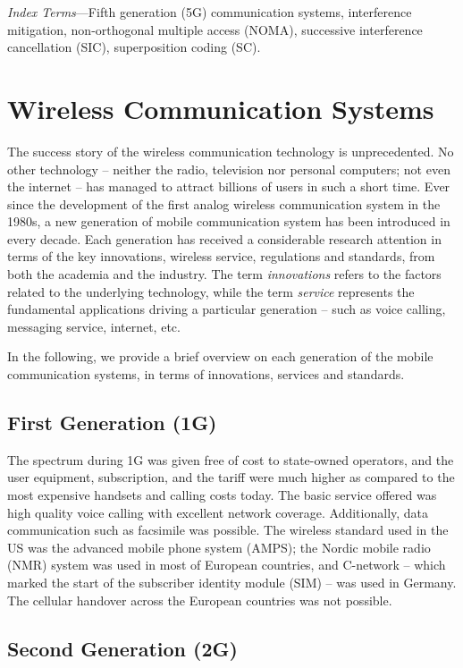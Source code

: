 \begin{multicols}{2}
\textit{Index Terms}---Fifth generation (5G) communication systems, interference mitigation, non-orthogonal multiple access (NOMA), successive interference cancellation (SIC), superposition coding (SC).


\section{Wireless Communication Systems}

The success story of the wireless communication technology is unprecedented. No other technology -- neither the radio, television nor personal computers; not even the internet -- has managed to attract billions of users in such a short time. Ever since the development of the first analog wireless communication system in the 1980s, a new generation of mobile communication system has been introduced in every decade. Each generation has received a considerable research attention in terms of the key innovations, wireless service, regulations and standards, from both the academia and the industry. The term \emph{innovations} refers to the factors related to the underlying technology, while the term \emph{service} represents the fundamental applications driving a particular generation -- such as voice calling, messaging service, internet, etc.

In the following, we provide a brief overview on each generation of the mobile communication systems, in terms of innovations, services and standards.

\subsection{First Generation (1G)} \label{SubSec_1G}

The spectrum during 1G was given free of cost to state-owned operators, and the user equipment, subscription, and the tariff were much higher as compared to the most expensive handsets and calling costs today. The basic service offered was high quality voice calling with excellent network coverage. Additionally, data communication such as facsimile was possible. The wireless standard used in the US was the advanced mobile phone system (AMPS); the Nordic mobile radio (NMR) system was used in most of European countries, and C-network -- which marked the start of the subscriber identity module (SIM) -- was used in Germany. The cellular handover across the European countries was not possible.

\subsection{Second Generation (2G)} \label{SubSec_2G}


\end{multicols}
